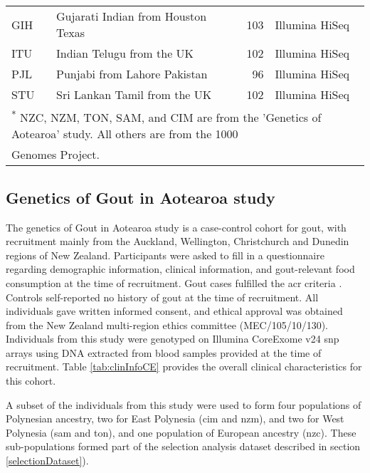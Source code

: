 \documentclass[twoside,openright]{report}
\begin{document}
\begin{table}
\begin{tabular}[t]{llrl}
\hspace{1em}GIH & Gujarati Indian from Houston Texas & 103 & Illumina HiSeq\\
\hspace{1em}ITU & Indian Telugu from the UK & 102 & Illumina HiSeq\\
\hspace{1em}PJL & Punjabi from Lahore Pakistan & 96 & Illumina HiSeq\\
\hspace{1em}STU & Sri Lankan Tamil from the UK & 102 & Illumina HiSeq\\
\bottomrule
\multicolumn{4}{l}{\textsuperscript{*} NZC, NZM, TON, SAM, and CIM are from the 'Genetics of Aotearoa' study. All others are from the 1000}\\
\multicolumn{4}{l}{Genomes Project.}\\
\end{tabular}
\end{table}

\subsection{Genetics of Gout in Aotearoa
study}\label{genetics-of-gout-in-aotearoa-study}

The genetics of Gout in Aotearoa study is a case-control cohort for
gout, with recruitment mainly from the Auckland, Wellington,
Christchurch and Dunedin regions of New Zealand. Participants were asked
to fill in a questionnaire regarding demographic information, clinical
information, and gout-relevant food consumption at the time of
recruitment. Gout cases fulfilled the \gls{acr} criteria
\citep{Wallace1977a}. Controls self-reported no history of gout at the
time of recruitment. All individuals gave written informed consent, and
ethical approval was obtained from the New Zealand multi-region ethics
committee (MEC/105/10/130). Individuals from this study were genotyped
on Illumina CoreExome v24 \gls{snp} arrays using DNA extracted from
blood samples provided at the time of recruitment. Table
\ref{tab:clinInfoCE} provides the overall clinical characteristics for
this cohort.

A subset of the individuals from this study were used to form four
populations of Polynesian ancestry, two for East Polynesia (\gls{cim}
and \gls{nzm}), and two for West Polynesia (\gls{sam} and \gls{ton}),
and one population of European ancestry (\gls{nzc}). These
sub-populations formed part of the selection analysis dataset described
in section \ref{selectionDataset}).
\end{document}
